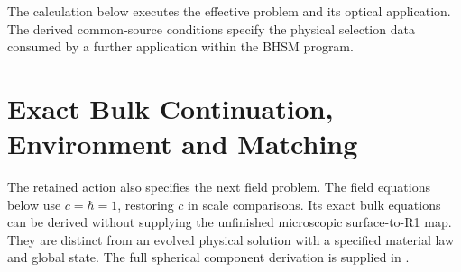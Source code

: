 The calculation below executes the effective problem and its optical
application. The derived common-source conditions specify the physical
selection data consumed by a further application within the BHSM program.


\section{Exact Bulk Continuation, Environment and Matching}
\label{app:continuation}
The retained action also specifies the next field problem. The field
equations below use $c=\hbar=1$, restoring $c$ in scale comparisons. Its
exact bulk equations can be derived without supplying the unfinished microscopic
surface-to-R1 map. They are distinct from an evolved physical solution
with a specified material law and global state. The full spherical
component derivation is supplied in
.

